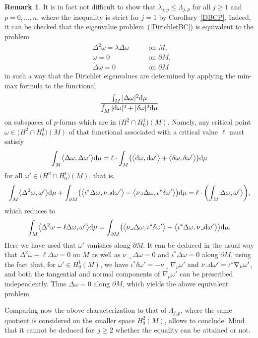 \documentclass[10pt,a4paper]{amsart}
\numberwithin{equation}{section}
\theoremstyle{definition}
\newtheorem{Remark}[Theorem]{Remark}
\begin{document}
\begin{Remark}
It is in fact not difficult to show that $\lambda_{j,p}\leq\Lambda_{j,p}$ for all $j\geq 1$ and $p=0,\dots,n$, where the inequality is strict for $j=1$ by Corollary~\ref{DBCP}.
Indeed, it can be checked that the eigenvalue problem~(\ref{DirichletBC}) is equivalent to the problem
\[
\begin{aligned}
&\Delta^2 \omega =\lambda \Delta\omega \ \quad&&\textrm{on } M, \\
&\omega =0 \ \quad&&\textrm{on }\partial M, \\
&\Delta\omega = 0 \ \quad && \textrm{on }\partial M
\end{aligned}
\]
in such a way that the Dirichlet eigenvalues are determined by applying the min-max formula to the functional
\[
\frac{\int_M|\Delta \omega|^2{\rm d}\mu}{\int_M|{\rm d}\omega|^2+|\delta\omega|^2{\rm d}\mu}
\]
 on subspaces of $p$-forms which are in $\bigl(H^2\cap H_0^1\bigr)(M)$.
Namely, any critical point $\omega\in\bigl(H^2\cap H_0^1\bigr)(M)$ of that functional associated with a critical value $\ell$ must satisfy
\[
\int_M\bigl\langle\Delta\omega,\Delta\omega'\bigr\rangle {\rm d}\mu=\ell\cdot\int_M\bigl(\bigl\langle {\rm d}\omega,{\rm d}\omega'\bigr\rangle+\bigl\langle \delta\omega,\delta\omega'\bigr\rangle\bigr){\rm d}\mu
\]
for all $\omega'\in\bigl(H^2\cap H_0^1\bigr)(M)$, that is,
\[
\int_M\bigl\langle\Delta^2\omega,\omega'\bigr\rangle {\rm d}\mu+\int_{\partial M}\bigl(\bigl\langle\iota^*\Delta\omega,\nu\lrcorner {\rm d}\omega'\bigr\rangle-\bigl\langle\nu\lrcorner\Delta\omega,\iota^*\delta\omega'\bigr\rangle\bigr){\rm d}\mu=\ell\cdot\biggl(\int_M\Delta\omega,\omega'\bigr\rangle\biggr),
\]
which reduces to
\[
\int_M\bigl\langle\Delta^2\omega-\ell\Delta\omega,\omega'\bigr\rangle {\rm d}\mu=\int_{\partial M}\bigl(\bigl\langle\nu\lrcorner\Delta\omega,\iota^*\delta\omega'\bigr\rangle-\bigl\langle\iota^*\Delta\omega,\nu\lrcorner {\rm d}\omega'\bigr\rangle\bigr){\rm d}\mu.
\]
Here we have used that $\omega'$ vanishes along $\partial M$.
It can be deduced in the usual way that ${\Delta^2\omega-\ell\Delta\omega=0}$ on $M$ as well as $\nu\lrcorner\Delta\omega=0$ and $\iota^*\Delta\omega=0$ along $\partial M$, using the fact that, for $\omega'\in H_0^1(M)$, we have $\iota^*\delta\omega'=-\nu\lrcorner\nabla_\nu\omega'$ and $\nu\lrcorner {\rm d}\omega'=\iota^*\nabla_\nu\omega'$, and both the tangential and normal components of $\nabla_\nu\omega'$ can be prescribed independently.
Thus $\Delta\omega=0$ along $\partial M$, which yields the above equivalent problem.

Comparing now the above characterization to that of $\Lambda_{j,p}$, where the same quotient is considered on the smaller space $H^2_0(M)$, allows to conclude.
Mind that it cannot be deduced for~${j\geq2}$ whether the equality can be attained or not.
\end{Remark}
\end{document}
